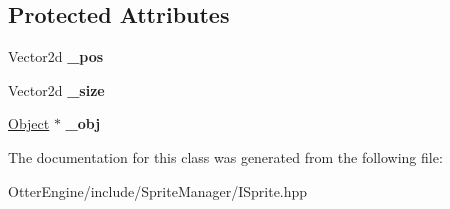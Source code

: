 \subsection*{Protected Attributes}
\begin{DoxyCompactItemize}
\item 
Vector2d {\bfseries \+\_\+pos}\hypertarget{class_otter_engine_1_1_i_sprite_a7a37f4e2aae9c14088308bebb8ccb1eb}{}\label{class_otter_engine_1_1_i_sprite_a7a37f4e2aae9c14088308bebb8ccb1eb}

\item 
Vector2d {\bfseries \+\_\+size}\hypertarget{class_otter_engine_1_1_i_sprite_a3c02415e3bda446e2a5fc085ecb10b23}{}\label{class_otter_engine_1_1_i_sprite_a3c02415e3bda446e2a5fc085ecb10b23}

\item 
\hyperlink{class_otter_engine_1_1_object}{Object} $\ast$ {\bfseries \+\_\+obj}\hypertarget{class_otter_engine_1_1_i_sprite_a7c5a452a2553048e56714835f15f8265}{}\label{class_otter_engine_1_1_i_sprite_a7c5a452a2553048e56714835f15f8265}

\end{DoxyCompactItemize}


The documentation for this class was generated from the following file\+:\begin{DoxyCompactItemize}
\item 
Otter\+Engine/include/\+Sprite\+Manager/I\+Sprite.\+hpp\end{DoxyCompactItemize}
